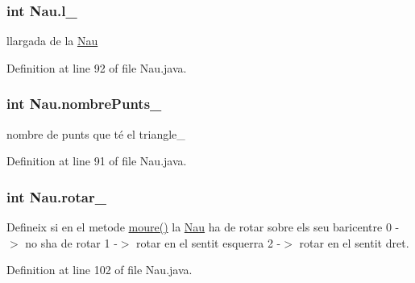 \subsubsection[{l\+\_\+}]{\setlength{\rightskip}{0pt plus 5cm}int Nau.\+l\+\_\+\hspace{0.3cm}{\ttfamily [protected]}}\label{class_nau_a67c5417119c7e520e1876a919119867d}


llargada de la \hyperlink{class_nau}{Nau} 



Definition at line 92 of file Nau.\+java.

\hypertarget{class_nau_adaf4948df660e9cfcac14a3fb75de454}{}
\subsubsection[{nombre\+Punts\+\_\+}]{\setlength{\rightskip}{0pt plus 5cm}int Nau.\+nombre\+Punts\+\_\+\hspace{0.3cm}{\ttfamily [private]}}\label{class_nau_adaf4948df660e9cfcac14a3fb75de454}


nombre de punts que té el triangle\+\_\+ 



Definition at line 91 of file Nau.\+java.

\hypertarget{class_nau_a128a1860c49ef16bfd63406f4ef0db75}{}
\subsubsection[{rotar\+\_\+}]{\setlength{\rightskip}{0pt plus 5cm}int Nau.\+rotar\+\_\+\hspace{0.3cm}{\ttfamily [private]}}\label{class_nau_a128a1860c49ef16bfd63406f4ef0db75}


Defineix si en el metode \hyperlink{class_nau_a8dc46f91e02910b92bfad9b798f6552c}{moure()} la \hyperlink{class_nau}{Nau} ha de rotar sobre els seu baricentre 0 -\/$>$ no s\textquotesingle{}ha de rotar 1 -\/$>$ rotar en el sentit esquerra 2 -\/$>$ rotar en el sentit dret. 



Definition at line 102 of file Nau.\+java.

\hypertarget{class_nau_ad397487e3dc0062cc71fdfc4c562e347}{}
